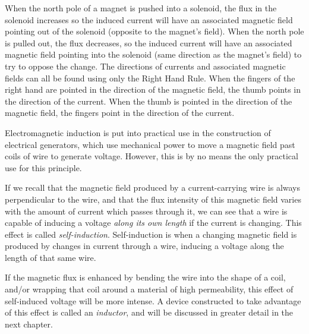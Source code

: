 {When the north pole of a magnet is pushed into a solenoid, the
flux in the solenoid increases so the induced current will have an
associated magnetic field pointing out of the solenoid (opposite
to the magnet's field).  When the north pole is pulled out, the
flux decreases, so the induced current will have an associated
magnetic field pointing into the solenoid (same direction as the
magnet's field) to try to oppose the change. The directions of
currents and associated magnetic fields can all be found using
only the Right Hand Rule. When the fingers of the right hand are
pointed in the direction of the magnetic field, the thumb points in the
direction of the current. When the thumb is pointed in the
direction of the magnetic field, the fingers point in the
direction of the current.



Electromagnetic induction is put into practical use in the
construction of electrical generators, which use mechanical power
to move a magnetic field past coils of wire to generate voltage.
However, this is by no means the only practical use for this
principle.

If we recall that the magnetic field produced by a
current-carrying wire is always perpendicular to the wire, and
that the flux intensity of this magnetic field varies with the
amount of current which passes through it, we can see that a wire is capable of
inducing a voltage \textit{along its own length} if the current is changing. This effect is called
\textit{self-induction}. Self-induction is when a changing magnetic field is produced by
changes in current through a wire, inducing a voltage along the
length of that same wire.

If the magnetic flux is enhanced
by bending the wire into the shape of a coil, and/or wrapping that
coil around a material of high permeability, this effect of
self-induced voltage will be more intense. A device constructed to
take advantage of this effect is called an \textit{inductor}, and
will be discussed in greater detail in the next chapter.

}
